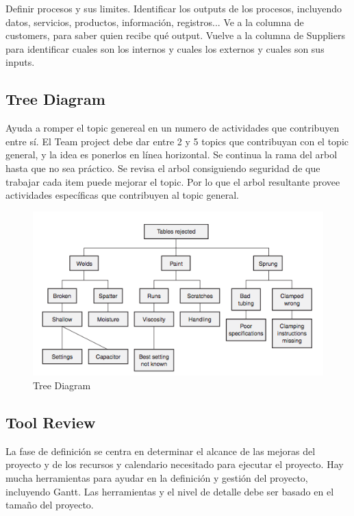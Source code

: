 \documentclass[]{article}
\begin{document}
Definir procesos y sus limites. Identificar los outputs de los procesos, incluyendo datos, servicios, productos, información, registros... Ve a la columna de customers, para saber quien recibe qué output. Vuelve a la columna de Suppliers para identificar cuales son los internos y cuales los externos y cuales son sus inputs.

\subsection{Tree Diagram}

Ayuda a romper el topic genereal en un numero de actividades que contribuyen entre sí. El Team project debe dar entre 2 y 5 topics que contribuyan con el topic general, y la idea es ponerlos en línea horizontal. Se continua la rama del arbol hasta que no sea práctico. Se revisa el arbol consiguiendo seguridad de que trabajar cada item puede mejorar el topic. Por lo que el arbol resultante provee actividades específicas que contribuyen al topic general.

\begin{figure}[ht!]
	\centering
	\includegraphics[width=120mm]{imagenes/TreeDiagram.png}
	\caption{Tree Diagram}
	\label{fig:TreeDiagram}
\end{figure}

\subsection{Tool Review}

La fase de definición se centra en determinar el alcance de las mejoras del proyecto y de los recursos y calendario necesitado para ejecutar el proyecto. Hay mucha herramientas para ayudar en la definición y gestión del proyecto, incluyendo Gantt. Las herramientas y el nivel de detalle debe ser basado en el tamaño del proyecto.
\end{document}

